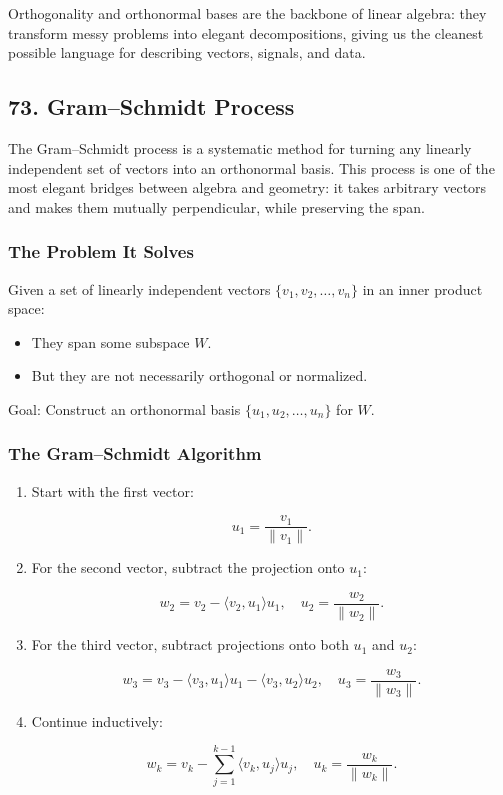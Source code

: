 \documentclass[
  letterpaper,
  DIV=11,
  numbers=noendperiod]{scrreprt}
\providecommand{\tightlist}{%
  \setlength{\itemsep}{0pt}\setlength{\parskip}{0pt}}
\begin{document}
Orthogonality and orthonormal bases are the backbone of linear algebra:
they transform messy problems into elegant decompositions, giving us the
cleanest possible language for describing vectors, signals, and data.

\subsection{73. Gram--Schmidt Process}\label{gramschmidt-process}

The Gram--Schmidt process is a systematic method for turning any
linearly independent set of vectors into an orthonormal basis. This
process is one of the most elegant bridges between algebra and geometry:
it takes arbitrary vectors and makes them mutually perpendicular, while
preserving the span.

\subsubsection{The Problem It Solves}\label{the-problem-it-solves}

Given a set of linearly independent vectors \(\{v_1, v_2, \dots, v_n\}\)
in an inner product space:

\begin{itemize}
\tightlist
\item
  They span some subspace \(W\).
\item
  But they are not necessarily orthogonal or normalized.
\end{itemize}

Goal: Construct an orthonormal basis \(\{u_1, u_2, \dots, u_n\}\) for
\(W\).

\subsubsection{The Gram--Schmidt
Algorithm}\label{the-gramschmidt-algorithm}

\begin{enumerate}
\def\labelenumi{\arabic{enumi}.}
\item
  Start with the first vector:

  \[
  u_1 = \frac{v_1}{\|v_1\|}.
  \]
\item
  For the second vector, subtract the projection onto \(u_1\):

  \[
  w_2 = v_2 - \langle v_2, u_1 \rangle u_1, \quad u_2 = \frac{w_2}{\|w_2\|}.
  \]
\item
  For the third vector, subtract projections onto both \(u_1\) and
  \(u_2\):

  \[
  w_3 = v_3 - \langle v_3, u_1 \rangle u_1 - \langle v_3, u_2 \rangle u_2, \quad u_3 = \frac{w_3}{\|w_3\|}.
  \]
\item
  Continue inductively:

  \[
  w_k = v_k - \sum_{j=1}^{k-1} \langle v_k, u_j \rangle u_j, \quad u_k = \frac{w_k}{\|w_k\|}.
  \]
\end{enumerate}
\end{document}
